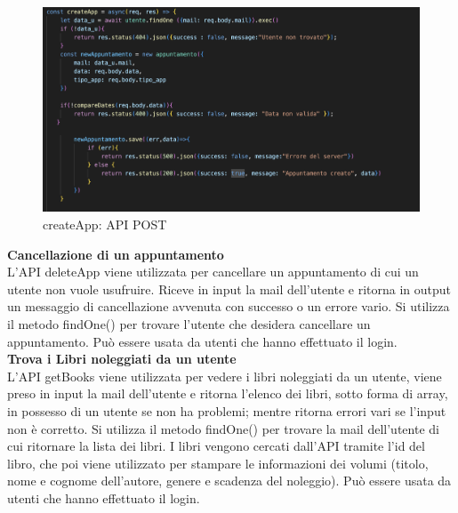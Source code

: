\documentclass{article}
\begin{document}
\begin{figure}[H]
    \centering
    \includegraphics[width=120mm]{D4/Images/APIPost.png}
    \caption{createApp: API POST}
\end{figure}

\noindent \textbf{Cancellazione di un appuntamento}\\
L'API deleteApp viene utilizzata per cancellare un appuntamento di cui un utente non vuole usufruire.
Riceve in input la mail dell'utente e ritorna in output un messaggio  di cancellazione avvenuta con successo o un errore vario.
Si utilizza il metodo findOne() per trovare l'utente che desidera cancellare un appuntamento. Può essere usata da utenti che hanno effettuato il login.\\

\noindent \textbf{Trova i Libri noleggiati da un utente}\\
L'API getBooks viene utilizzata per vedere i libri noleggiati da un utente, viene preso in input la mail dell'utente e ritorna l'elenco dei libri, sotto forma di array, in possesso di un utente se non ha problemi; mentre ritorna errori vari se l'input non è corretto.
Si utilizza il metodo findOne() per trovare la mail dell'utente di cui ritornare la lista dei libri. I libri vengono cercati dall'API tramite l'id del libro, che poi viene utilizzato per stampare le informazioni dei volumi (titolo, nome e cognome dell'autore, genere e scadenza del noleggio). Può essere usata da utenti che hanno effettuato il login.\\
\end{document}
